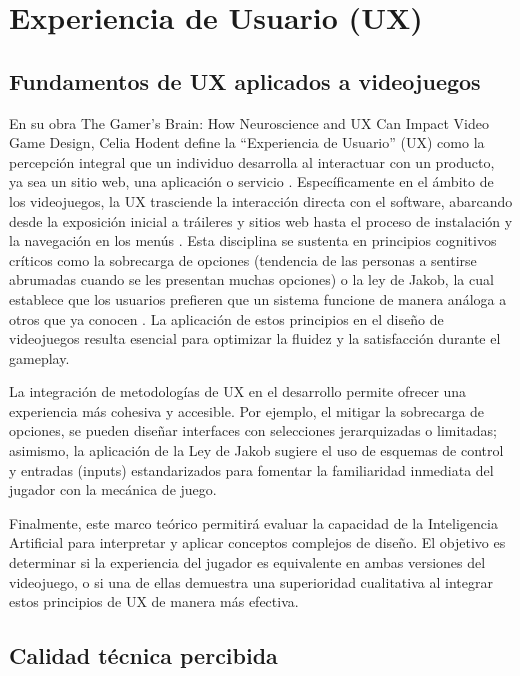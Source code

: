 \section{Experiencia de Usuario (UX)}
\subsection{Fundamentos de UX aplicados a videojuegos}

En su obra The Gamer’s Brain: How Neuroscience and UX Can Impact Video Game Design, Celia Hodent define la “Experiencia de Usuario” (UX) como la percepción integral que un individuo desarrolla al interactuar con un producto, ya sea un sitio web, una aplicación o servicio \cite{hodent2018}. Específicamente en el ámbito de los videojuegos, la UX trasciende la interacción directa con el software, abarcando desde la exposición inicial a tráileres y sitios web hasta el proceso de instalación y la navegación en los menús \cite{hodent2018}. Esta disciplina se sustenta en principios cognitivos críticos como la sobrecarga de opciones (tendencia de las personas a sentirse abrumadas cuando se les presentan muchas opciones) o la ley de Jakob, la cual establece que los usuarios prefieren que un sistema funcione de manera análoga a otros que ya conocen \cite{yablonski2026ux}. La aplicación de estos principios en el diseño de videojuegos resulta esencial para optimizar la fluidez y la satisfacción durante el gameplay.

La integración de metodologías de UX en el desarrollo permite ofrecer una experiencia más cohesiva y accesible. Por ejemplo, el mitigar la sobrecarga de opciones, se pueden diseñar interfaces con selecciones jerarquizadas o limitadas; asimismo, la aplicación de la Ley de Jakob sugiere el uso de esquemas de control y entradas (inputs) estandarizados para fomentar la familiaridad inmediata del jugador con la mecánica de juego.

Finalmente, este marco teórico permitirá evaluar la capacidad de la Inteligencia Artificial para interpretar y aplicar conceptos complejos de diseño. El objetivo es determinar si la experiencia del jugador es equivalente en ambas versiones del videojuego, o si una de ellas demuestra una superioridad cualitativa al integrar estos principios de UX de manera más efectiva.

\subsection{Calidad técnica percibida}

